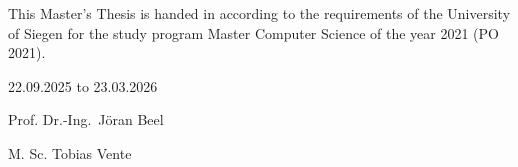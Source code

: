 \documentclass[12pt,a4paper]{article}
\newcommand{\titlepagefont}{\ebgaramond}
\begin{document}
\begin{titlepage}
    \thispagestyle{empty}
    \titlepagefont
    \vspace*{\fill}

    \noindent
    This Master's Thesis is handed in according to the requirements of the University of Siegen for the study program Master Computer Science of the year 2021 (PO 2021).

    \vspace{1.6cm}

    \vspace{0.2cm}
    22.09.2025 to 23.03.2026

    \vspace{1.0cm}

    \vspace{0.2cm}
    Prof. Dr.-Ing.\ J\"oran Beel\par
    M. Sc. Tobias Vente

    \vspace*{\fill}
\end{titlepage}
\end{document}
